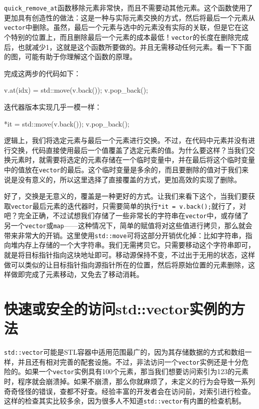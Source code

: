 
\texttt{quick\_remove\_at}函数移除元素非常快，而且不需要动其他元素。这个函数使用了更加具有创造性的做法：这是一种与实际元素交换的方式，然后将最后一个元素从\texttt{vector}中删除。虽然，最后一个元素与选中的元素没有实际的关联，但是它在这个特别的位置上，而且删除最后一个元素的成本最低！\texttt{vector}的长度在删除完成后，也就减少1，这就是这个函数所要做的。并且无需移动任何元素。看一下下面的图，可能有助于你理解这个函数的原理。


完成这两步的代码如下：

\begin{codebox}[cpp]
v.at(idx) = std::move(v.back());
v.pop_back();
\end{codebox}

迭代器版本实现几乎一模一样：

\begin{codebox}[cpp]
*it = std::move(v.back());
v.pop_back();
\end{codebox}

逻辑上，我们将选定元素与最后一个元素进行交换。不过，在代码中元素并没有进行交换，代码直接使用最后一个值覆盖了选定元素的值。为什么要这样？当我们交换元素时，就需要将选定的元素存储在一个临时变量中，并在最后将这个临时变量中的值放在\texttt{vector}的最后。这个临时变量是多余的，而且要删除的值对于我们来说是没有意义的，所以这里选择了直接覆盖的方式，更加高效的实现了删除。

好了，交换是无意义的，覆盖是一种更好的方式。让我们来看下这个，当我们要获取\texttt{vector}最后元素的迭代器时，只需要简单的执行\texttt{*it = v.back();}就行了，对吧？完全正确，不过试想我们存储了一些非常长的字符串在\texttt{vector}中，或存储了另一个\texttt{vector}或\texttt{map}——这种情况下，简单的赋值将对这些值进行拷贝，那么就会带来非常大的开销。这里使用\texttt{std::move}可将这部分开销优化掉：比如字符串，指向堆内存上存储的一个大字符串。我们无需拷贝它。只需要移动这个字符串即可，就是将目标指针指向这块地址即可。移动源保持不变，不过出于无用的状态，这样做可以类似的让目标指针指向源指针所在的位置，然后将原始位置的元素删除，这样做即完成了元素移动，又免去了移动消耗。


\section{快速或安全的访问std::vector实例的方法}

\texttt{std::vector}可能是STL容器中适用范围最广的，因为其存储数据的方式和数组一样，并且还有相对完善的配套设施。不过，非法访问一个\texttt{vector}实例还是十分危险的。如果一个\texttt{vector}实例具有100个元素，那当我们想要访问索引为123的元素时，程序就会崩溃掉。如果不崩溃，那么你就麻烦了，未定义的行为会导致一系列奇奇怪怪的错误，查都不好查。经验丰富的开发者会在访问前，对索引进行检查。这样的检查其实比较多余，因为很多人不知道\texttt{std::vector}有内置的检查机制。

